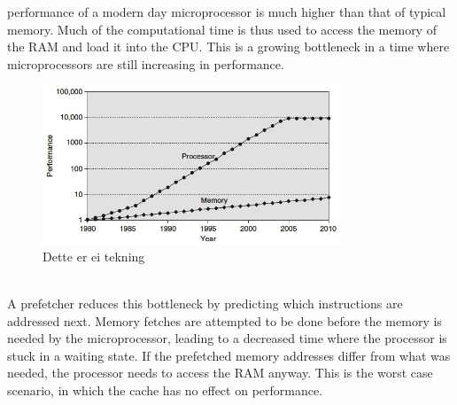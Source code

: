  performance of a modern day microprocessor is much higher than that of typical memory. Much of the computational time is thus used to access the memory of the RAM and load it into the CPU. This is a growing bottleneck in a time where microprocessors are still increasing in performance. 
\\
\begin{figure}[h!]
	\includegraphics[width=3.5in]{graphics/CPUmemoryGap.jpg}
	\caption{Dette er ei tekning}
\end{figure}
\\
A prefetcher reduces this bottleneck by predicting which instructions are addressed next. Memory fetches are attempted to be done before the memory is needed by the microprocessor, leading to a decreased time where the processor is stuck in a waiting state. If the prefetched memory addresses differ from what was needed, the processor needs to access the RAM anyway. This is the worst case scenario, in which the cache has no effect on performance.

